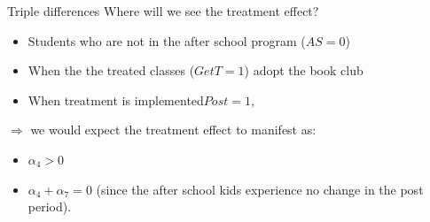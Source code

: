 \documentclass[
  ignorenonframetext,
]{beamer}
\begin{document}
\begin{frame}{Triple differences}
\protect\hypertarget{triple-differences-2}{}
Where will we see the treatment effect?

\begin{itemize}
\item
  Students who are not in the after school program (\(AS=0\))
\item
  When the the treated classes (\(GetT=1\)) adopt the book club
\item
  When treatment is implemented\(Post=1\),
\end{itemize}

\(\Rightarrow\) we would expect the treatment effect to manifest as:

\begin{itemize}
\item
  \(\alpha_4>0\)
\item
  \(\alpha_4+\alpha_7=0\) (since the after school kids experience no
  change in the post period).
\end{itemize}
\end{frame}
\end{document}
